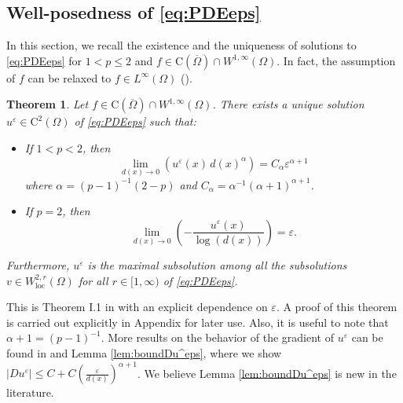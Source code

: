 \documentclass[12pt,reqno]{amsart}
\numberwithin{figure}{section}
\theoremstyle{plain}
\newtheorem{thm}{Theorem}[section]
\theoremstyle{remark}
\numberwithin{equation}{section}
\begin{document}




\subsection{Well-posedness of \eqref{eq:PDEeps}} In this section, we recall the existence and the uniqueness of solutions to \eqref{eq:PDEeps} for $1<p\leq 2$ and $f\in \mathrm{C}(\overline{\Omega})\cap W^{1,\infty}(\Omega)$. In fact, the assumption of $f$ can be relaxed to $f\in L^\infty(\Omega)$ (\cite{Lasry1989}).

\begin{thm}\label{thm:wellposed1<p<2} Let $f\in \mathrm{C}(\overline{\Omega})\cap W^{1,\infty}(\Omega)$. There exists a unique solution $u^\varepsilon\in \mathrm{C}^2(\Omega)$ of \eqref{eq:PDEeps} such that:
\begin{itemize}
    \item[(i)] If $1<p< 2$, then 
\begin{equation}\label{rate_p<2}
    \lim_{d(x)\to 0}\left( u^\varepsilon(x) \,d(x)^\alpha \right)= C_\alpha \varepsilon^{\alpha+1}
\end{equation}
where $\alpha = (p-1)^{-1}(2-p)$ and $C_\alpha = \alpha^{-1}(\alpha+1)^{\alpha+1}$.
\item[(ii)] If $p=2$, then
\begin{equation}\label{rate_p=2}
    \lim_{d(x)\to 0} \left(-\frac{u^\varepsilon(x)}{\log(d(x))}\right) = \varepsilon.
\end{equation}
\end{itemize}
Furthermore, $u^\varepsilon$ is the maximal subsolution among all the subsolutions $v\in W^{2,r}_{\mathrm{loc}}(\Omega)$ for all $r\in [1,\infty)$ of \eqref{eq:PDEeps}.
\end{thm}
\noindent This is Theorem I.1 in \cite{Lasry1989} with an explicit dependence on $\varepsilon$. A proof of this theorem is carried out explicitly in Appendix for later use. Also, it is useful to note that $\alpha+1 = (p-1)^{-1}$. More results on the behavior of the gradient of $u^\varepsilon$ can be found in \cite{alessio_asymptotic_2006} and Lemma \ref{lem:boundDu^eps}, where we show $|Du^\varepsilon|\leq C + C\left(\frac{\varepsilon}{d(x)}\right)^{\alpha+1}$. We believe Lemma \ref{lem:boundDu^eps} is new in the literature.
\end{document}
